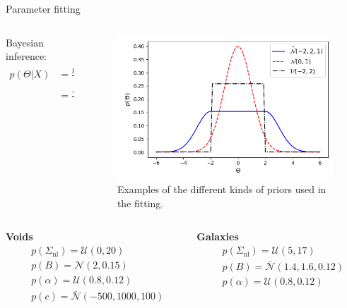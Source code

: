 \documentclass{beamer}
\begin{document}
\begin{frame}[allowframebreaks]{Parameter fitting}
\begin{columns}
	\begin{column}{0.49\linewidth}
		Bayesian inference: 
		\begin{equation}
		\begin{split}
		p(\Theta|X) &= \frac{p(X|\Theta)p(\Theta)}{p(X)} \\&= \frac{\mathcal{L}(\Theta)p(\Theta)}{\mathcal{Z}},
		\end{split}
		\label{eq:bayes}
		\end{equation}
	\end{column}
	\begin{column}{0.49\linewidth}
		\begin{figure}
			\centering
			\includegraphics[width=1\linewidth]{plots/priors}
			\caption{Examples of the different kinds of priors used in the fitting.}
			\label{fig:priors}
		\end{figure}

	\end{column}
\end{columns}
\pagebreak
\begin{columns}
	\begin{column}{0.49\linewidth}
		\textbf{Voids}
		\begin{align}
		&p(\Sigma_{\mathrm{nl}}) = \mathcal{U}(0, 20)\\
		&p(B) = \mathcal{N}(2, 0.15)\\
		&p(\alpha)=\mathcal{U}(0.8, 0.12)\\
		&p(c) = \bar{\mathcal{N}}(-500, 1000, 100)
		\end{align}
	\end{column}
	\begin{column}{0.49\linewidth}
		\textbf{Galaxies}
		\begin{align}
		&p(\Sigma_{\mathrm{nl}}) = \mathcal{U}(5, 17)\\
		&p(B) = \bar{\mathcal{N}}(1.4, 1.6, 0.12)\\
		&p(\alpha)=\mathcal{U}(0.8, 0.12)
		\end{align}
	\end{column}
\end{columns}
\end{frame}
\end{document}

